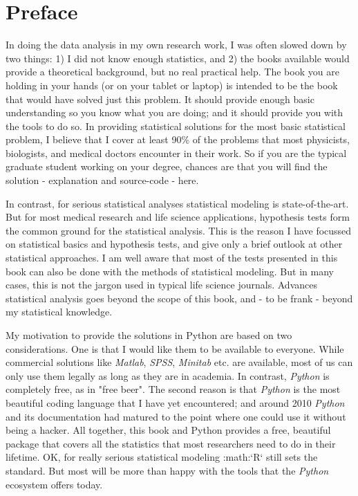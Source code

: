 \chapter*{Preface}

In doing the data analysis in my own research work, I was often slowed down by two things: 1) I did not know enough statistics, and 2) the books available would provide a theoretical background, but no real practical help. The book you are holding in your hands (or on your tablet or laptop) is intended to be the book that would have solved just this problem. It should provide enough basic understanding so you know what you are doing; and it should provide you with the tools to do so. In providing statistical solutions for the most basic statistical problem, I believe that I cover at least 90\% of the problems that most physicists, biologists, and medical doctors encounter in their work. So if you are the typical graduate student working on your degree, chances are that you will find the solution - explanation and source-code - here.

In contrast, for serious statistical analyses statistical modeling is state-of-the-art. But for most medical research and life science applications, hypothesis tests form the common ground for the statistical analysis. This is the reason I have focussed on statistical basics and hypothesis tests, and give only a brief outlook at other statistical approaches. I am well aware that most of the tests presented in this book can also be done with the methods of statistical modeling. But in many cases, this is not the jargon used in typical life science journals. Advances statistical analysis goes beyond the scope of this book, and - to be frank - beyond my statistical knowledge.

My motivation to provide the solutions in Python are based on two considerations. One is that I would like them to be available to everyone. While commercial solutions like \emph{Matlab}, \emph{SPSS}, \emph{Minitab} etc. are available, most of us can only use them legally as long as they are in academia. In contrast, \emph{Python} is completely free, as in "free beer". The second reason is that \emph{Python} is the most beautiful coding language that I have yet encountered; and around 2010 \emph{Python} and its documentation had matured to
the point where one could use it without being a hacker. All together, this book and Python provides a free, beautiful package that covers all the statistics that most researchers need to do in their lifetime. OK, for really serious statistical modeling :math:`R` still sets the standard.
But most will be more than happy with the tools that the \emph{Python} ecosystem offers today.

